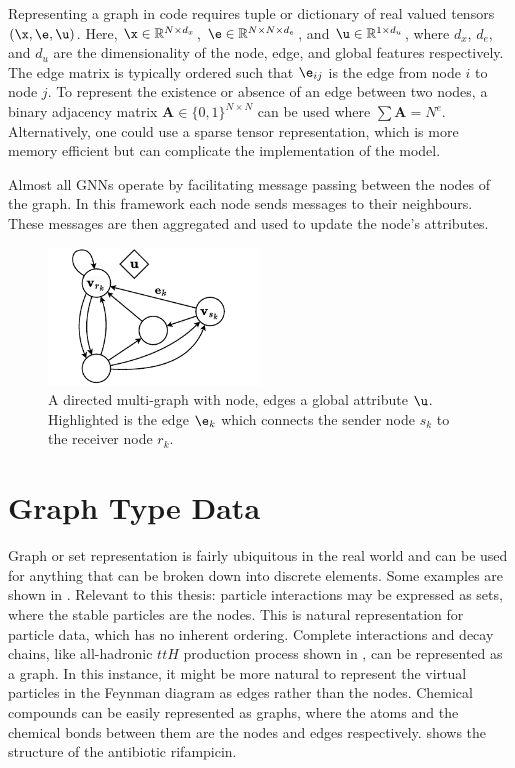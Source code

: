Representing a graph in code requires tuple or dictionary of real valued tensors $(\x, \e, \u)$.
Here, $\x \in \mathbb{R}^{N \times d_x}$, $\e \in \mathbb{R}^{N \times N \times d_e}$, and $\u \in \mathbb{R}^{1 \times d_u}$, where $d_x$, $d_e$, and $d_u$ are the dimensionality of the node, edge, and global features respectively.
The edge matrix is typically ordered such that $\e_{ij}$ is the edge from node $i$ to node $j$.
To represent the existence or absence of an edge between two nodes, a binary adjacency matrix $\mathbf{A} \in \{0, 1\}^{N \times N}$ can be used where $\sum{\mathbf{A}} = N^e$.
Alternatively, one could use a sparse tensor representation, which is more memory efficient but can complicate the implementation of the model.

Almost all GNNs operate by facilitating message passing between the nodes of the graph.
In this framework each node sends messages to their neighbours.
These messages are then aggregated and used to update the node's attributes.

\begin{figure}
    \centering
    \includegraphics[width=0.5\textwidth]{Figures/transformers/graphs.pdf}
    \caption{A directed multi-graph with node, edges a global attribute $\u$. Highlighted is the edge $\e_{k}$ which connects the sender node $s_k$ to the receiver node $r_k$.}
    \label{fig:graph}
\end{figure}

\section{Graph Type Data}

Graph or set representation is fairly ubiquitous in the real world and can be used for anything that can be broken down into discrete elements.
Some examples are shown in .
Relevant to this thesis: particle interactions may be expressed as sets, where the stable particles are the nodes.
This is natural representation for particle data, which has no inherent ordering.
Complete interactions and decay chains, like all-hadronic $ttH$ production process shown in , can be represented as a graph.
In this instance, it might be more natural to represent the virtual particles in the Feynman diagram as edges rather than the nodes.
Chemical compounds can be easily represented as graphs, where the atoms and the chemical bonds between them are the nodes and edges respectively.
 shows the structure of the antibiotic rifampicin.

